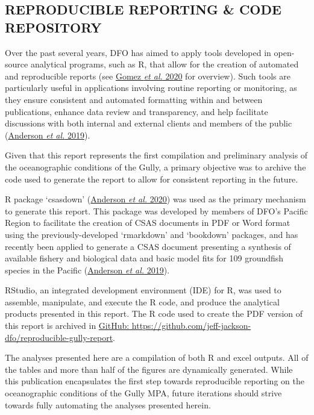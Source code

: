 \documentclass[12pt]{article}\usepackage[]{graphicx}\usepackage[]{color}
\begin{document}
\hypertarget{reproducible-reporting-code-repository}{%
\subsection{\texorpdfstring{\textbf{REPRODUCIBLE REPORTING \& CODE REPOSITORY}}{REPRODUCIBLE REPORTING \& CODE REPOSITORY}}\label{reproducible-reporting-code-repository}}

Over the past several years, DFO has aimed to apply tools developed in open-source analytical programs, such as R, that allow for the creation of automated and reproducible reports (see \protect\hyperlink{ref-gomez_2020}{Gomez \textit{et al.} 2020} for overview). Such tools are particularly useful in applications involving routine reporting or monitoring, as they ensure consistent and automated formatting within and between publications, enhance data review and transparency, and help facilitate discussions with both internal and external clients and members of the public (\protect\hyperlink{ref-anderson_2019}{Anderson \textit{et al.} 2019}).

Given that this report represents the first compilation and preliminary analysis of the oceanographic conditions of the Gully, a primary objective was to archive the code used to generate the report to allow for consistent reporting in the future.

R package `csasdown' (\protect\hyperlink{ref-anderson_2020}{Anderson \textit{et al.} 2020}) was used as the primary mechanism to generate this report. This package was developed by members of DFO's Pacific Region to facilitate the creation of CSAS documents in PDF or Word format using the previously-developed `rmarkdown' and `bookdown' packages, and has recently been applied to generate a CSAS document presenting a synthesis of available fishery and biological data and basic model fits for 109 groundfish species in the Pacific (\protect\hyperlink{ref-anderson_2019}{Anderson \textit{et al.} 2019}).

RStudio, an integrated development environment (IDE) for R, was used to assemble, manipulate, and execute the R code, and produce the analytical products presented in this report. The R code used to create the PDF version of this report is archived in \href{https://github.com/jeff-jackson-dfo/reproducible-gully-report}{GitHub: https://github.com/jeff-jackson-dfo/reproducible-gully-report}.

The analyses presented here are a compilation of both R and excel outputs. All of the tables and more than half of the figures are dynamically generated. While this publication encapsulates the first step towards reproducible reporting on the oceanographic conditions of the Gully MPA, future iterations should strive towards fully automating the analyses presented herein.
\end{document}
